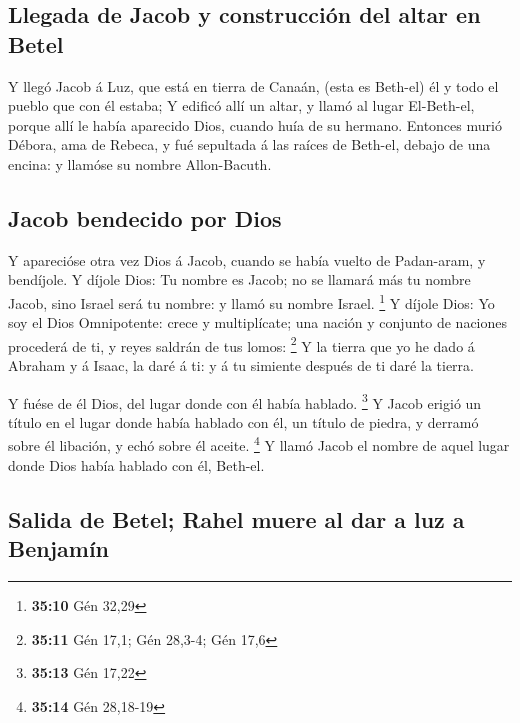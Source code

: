 \hypertarget{llegada-de-jacob-y-construcciuxf3n-del-altar-en-betel}{%
\subsection{Llegada de Jacob y construcción del altar en
Betel}\label{llegada-de-jacob-y-construcciuxf3n-del-altar-en-betel}}

 Y llegó Jacob á Luz, que está en tierra de Canaán, (esta
es Beth-el) él y todo el pueblo que con él estaba;  Y
edificó allí un altar, y llamó al lugar El-Beth-el, porque allí le había
aparecido Dios, cuando huía de su hermano.  Entonces murió
Débora, ama de Rebeca, y fué sepultada á las raíces de Beth-el, debajo
de una encina: y llamóse su nombre Allon-Bacuth.

\hypertarget{jacob-bendecido-por-dios}{%
\subsection{Jacob bendecido por Dios}\label{jacob-bendecido-por-dios}}

 Y aparecióse otra vez Dios á Jacob, cuando se había
vuelto de Padan-aram, y bendíjole.  Y díjole Dios: Tu
nombre es Jacob; no se llamará más tu nombre Jacob, sino Israel será tu
nombre: y llamó su nombre Israel. \footnote{\textbf{35:10} Gén 32,29}
 Y díjole Dios: Yo soy el Dios Omnipotente: crece y
multiplícate; una nación y conjunto de naciones procederá de ti, y reyes
saldrán de tus lomos: \footnote{\textbf{35:11} Gén 17,1; Gén 28,3-4; Gén
  17,6}  Y la tierra que yo he dado á Abraham y á Isaac,
la daré á ti: y á tu simiente después de ti daré la tierra.

 Y fuése de él Dios, del lugar donde con él había
hablado. \footnote{\textbf{35:13} Gén 17,22}  Y Jacob
erigió un título en el lugar donde había hablado con él, un título de
piedra, y derramó sobre él libación, y echó sobre él aceite. \footnote{\textbf{35:14}
  Gén 28,18-19}  Y llamó Jacob el nombre de aquel lugar
donde Dios había hablado con él, Beth-el.

\hypertarget{salida-de-betel-rahel-muere-al-dar-a-luz-a-benjamuxedn}{%
\subsection{Salida de Betel; Rahel muere al dar a luz a
Benjamín}\label{salida-de-betel-rahel-muere-al-dar-a-luz-a-benjamuxedn}}

